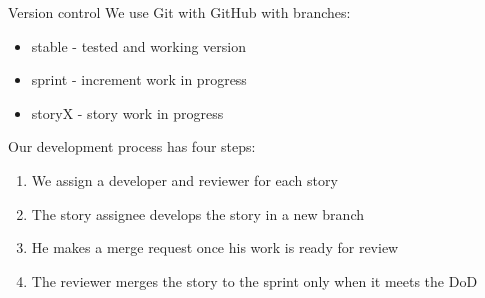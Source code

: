 \documentclass{beamer}
\begin{document}
\begin{frame}{Version control}
  We use Git with GitHub with branches:

  \begin{itemize}
  \item stable - tested and working version
  \item sprint - increment work in progress
  \item storyX - story work in progress
  \end{itemize}

  Our development process has four steps:

  \begin{enumerate}
  \item We assign a developer and reviewer for each story
  \item The story assignee develops the story in a new branch
  \item He makes a merge request once his work is ready for review
  \item The reviewer merges the story to the sprint only when it meets the DoD
  \end{enumerate}
\end{frame}
\end{document}
